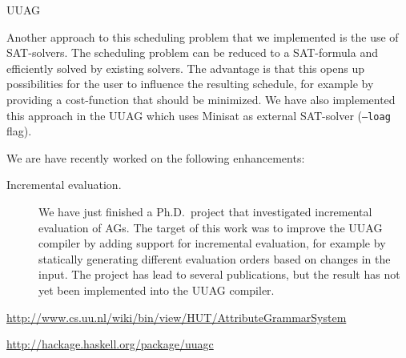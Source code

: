 \begin{hcarentry}[updated]{UUAG}
\begin{description}
Another approach to this scheduling problem that we implemented is the use of SAT-solvers.
The scheduling problem can be reduced to a SAT-formula and efficiently solved by existing solvers.
The advantage is that this opens up possibilities for the user to influence the resulting schedule,
for example by providing a cost-function that should be minimized. We have also implemented this
approach in the UUAG which uses Minisat as external SAT-solver (\texttt{--loag} flag).
\end{description}

We are have recently worked on the following enhancements:
\begin{description}
\item[Incremental evaluation.]
  We have just finished a Ph.D.\ project that investigated incremental evaluation of
  AGs. The target of this work was to improve the UUAG compiler by adding support for
  incremental evaluation, for example by statically generating different evaluation orders
  based on changes in the input. The project has lead to several publications, but the
  result has not yet been implemented into the UUAG compiler.
\end{description}

\FurtherReading
\begin{compactitem}
\item
  \url{http://www.cs.uu.nl/wiki/bin/view/HUT/AttributeGrammarSystem}
\item
  \url{http://hackage.haskell.org/package/uuagc}
\end{compactitem}
\end{hcarentry}
